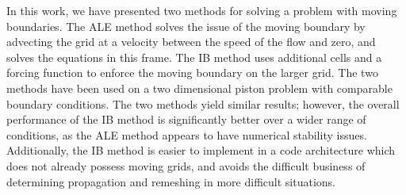 \documentclass{article}
\begin{document}
In this work, we have presented two methods for solving a problem with moving boundaries.  The ALE method solves the issue of the moving boundary by advecting the grid at a velocity between the speed of the flow and zero, and solves the equations in this frame.  The IB method uses additional cells and a forcing function to enforce the moving boundary on the larger grid.  The two methods have been used on a two dimensional piston problem with comparable boundary conditions.  The two methods yield similar results; however, the overall performance of the IB method is significantly better over a wider range of conditions, as the ALE method appears to have numerical stability issues.  Additionally, the IB method is easier to implement in a code architecture which does not already possess moving grids, and avoids the difficult business of determining propagation and remeshing in more difficult situations.







\end{document}

